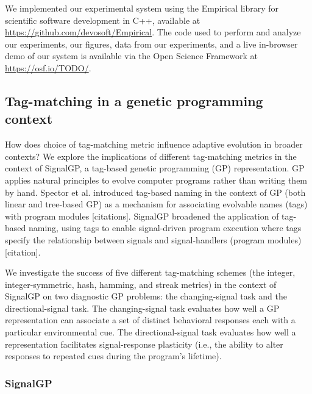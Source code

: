 We implemented our experimental system using the Empirical library for scientific software development in C++, available at \url{https://github.com/devosoft/Empirical}.
The code used to perform and analyze our experiments, our figures, data from our experiments, and a live in-browser demo of our system is available via the Open Science Framework at \url{https://osf.io/TODO/}.

\subsection{Tag-matching in a genetic programming context}

How does choice of tag-matching metric influence adaptive evolution in broader contexts?
We explore the implications of different tag-matching metrics in the context of SignalGP, a tag-based genetic
programming (GP) representation.
GP applies natural principles to evolve computer programs rather than writing them
by hand.
Spector et al. introduced tag-based naming in the context of GP (both linear and tree-based GP) as a
mechanism for associating evolvable names (tags) with program modules [citations].
SignalGP broadened the application of tag-based naming, using tags to enable signal-driven program
execution where tags specify the relationship between signals and signal-handlers (program modules)
[citation].

We investigate the success of five different tag-matching schemes (the integer, integer-symmetric, hash,
hamming, and streak metrics) in the context of SignalGP on two diagnostic GP problems: the changing-signal
task and the directional-signal task.
The changing-signal task evaluates how well a GP representation can associate
a set of distinct behavioral responses each with a particular environmental cue.
The directional-signal task evaluates how well a representation facilitates signal-response plasticity
(i.e., the ability to alter responses to repeated cues during the program's lifetime).

\subsubsection{SignalGP}

